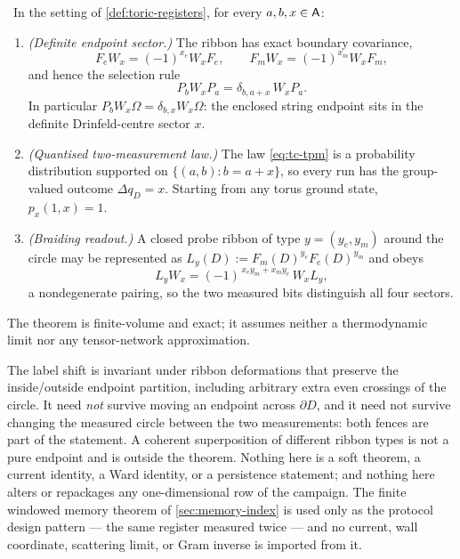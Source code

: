 \begin{theorem}\label{thm:toric-endpoint}
\statusProved\ In the setting of \cref{def:toric-registers}, for every
$a,b,x\in\mathsf{A}$:
\begin{enumerate}
\item \emph{(Definite endpoint sector.)} The ribbon has exact boundary
  covariance,
  \begin{equation}
    F_eW_x=(-1)^{x_e}W_xF_e,
    \qquad
    F_mW_x=(-1)^{x_m}W_xF_m,
    \label{eq:tc-covariance}
  \end{equation}
  and hence the selection rule
  \begin{equation}
    P_bW_xP_a=\delta_{b,a+x}\,W_xP_a .
    \label{eq:tc-selection}
  \end{equation}
  In particular $P_bW_x\Omega=\delta_{b,x}W_x\Omega$: the enclosed string
  endpoint sits in the definite Drinfeld-centre sector $x$.
\item \emph{(Quantised two-measurement law.)} The law \eqref{eq:tc-tpm} is a
  probability distribution supported on $\{(a,b):b=a+x\}$, so every run has the
  group-valued outcome $\Delta q_D=x$. Starting from any torus ground state,
  $p_x(1,x)=1$.
\item \emph{(Braiding readout.)} A closed probe ribbon of type $y=(y_e,y_m)$
  around the circle may be represented as
  $L_y(D):=F_m(D)^{y_e}F_e(D)^{y_m}$ and obeys
  \begin{equation}
    L_yW_x=(-1)^{\,x_ey_m+x_my_e}\,W_xL_y ,
    \label{eq:tc-braiding}
  \end{equation}
  a nondegenerate pairing, so the two measured bits distinguish all four
  sectors.
\end{enumerate}
The theorem is finite-volume and exact; it assumes neither a thermodynamic
limit nor any tensor-network approximation.
\end{theorem}

\begin{scope}
The label shift is invariant under ribbon deformations that preserve the
inside/outside endpoint partition, including arbitrary extra even crossings of
the circle. It need \emph{not} survive moving an endpoint across $\partial D$,
and it need not survive changing the measured circle between the two
measurements: both fences are part of the statement. A coherent superposition
of different ribbon types is not a pure endpoint and is outside the theorem.
Nothing here is a soft theorem, a current identity, a Ward identity, or a
persistence statement; and nothing here alters or repackages any
one-dimensional row of the campaign. The finite windowed memory theorem of
\cref{sec:memory-index} is used only as the protocol design pattern --- the
same register measured twice --- and no current, wall coordinate, scattering
limit, or Gram inverse is imported from it.
\end{scope}

